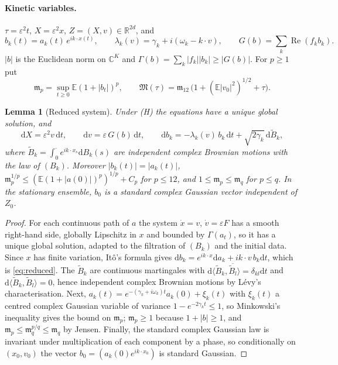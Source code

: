 \documentclass[11pt]{article}
\newcommand{\dd}{\mathrm{d}}
\newcommand{\E}{\mathbb{E}}
\newcommand{\eps}{\varepsilon}
\newcommand{\fm}{\mathfrak{m}}
\newcommand{\fM}{\mathfrak{M}}
\newcommand{\R}{\mathbb{R}}
\newcommand{\C}{\mathbb{C}}
\renewcommand{\Re}{\operatorname{Re}}
\newtheorem{lemma}[theorem]{Lemma}
\theoremstyle{remark}
\begin{document}
\paragraph{Kinetic variables.} $\tau=\eps^2t$, $X=\eps^2x$, $Z=(X,v)\in
\R^{2d}$, and
\[
  b_k(t)=a_k(t)\,e^{ik\cdot x(t)},\qquad
  \lambda_k(v)=\gamma_k+i(\omega_k-k\cdot v),\qquad
  G(b)=\sum_k\Re(f_kb_k).
\]
$|b|$ is the Euclidean norm on $\C^K$ and $\Gamma(b)=\sum_k|f_k||b_k|\ge
|G(b)|$. For $p\ge1$ put
\[
  \fm_p=\sup_{t\ge0}\E(1+|b_t|)^p ,\qquad
  \fM(\tau)=\fm_{12}\,\bigl(1+(\E|v_0|^2)^{1/2}+\tau\bigr).
\]

\begin{lemma}[Reduced system]\label{lem:reduced}
Under (H) the equations have a unique global solution, and
\begin{equation}
  \dd X=\eps^2v\,\dd t,\qquad \dd v=\eps\,G(b)\,\dd t,\qquad
  \dd b_k=-\lambda_k(v)\,b_k\,\dd t+\sqrt{2\gamma_k}\,\dd\tilde B_k ,
  \label{eq:reduced}
\end{equation}
where $\tilde B_k=\int_0^\cdot e^{ik\cdot x_s}\dd B_k(s)$ are independent
complex Brownian motions with the law of $(B_k)$. Moreover $|b_k(t)|=
|a_k(t)|$, $\fm_p^{1/p}\le(\E(1+|a(0)|)^p)^{1/p}+C_p$ for $p\le12$, and
$1\le\fm_p\le\fm_q$ for $p\le q$. In the stationary ensemble, $b_0$ is a
standard complex Gaussian vector independent of $Z_0$.
\end{lemma}

\begin{proof}
For each continuous path of $a$ the system $\dot x=v$, $\dot v=\eps F$ has
a smooth right-hand side, globally Lipschitz in $x$ and bounded by
$\Gamma(a_t)$, so it has a unique global solution, adapted to the filtration
of $(B_k)$ and the initial data. Since $x$ has finite variation, It\^o's
formula gives $\dd b_k=e^{ik\cdot x}\dd a_k+ik\cdot v\,b_k\dd t$, which is
\eqref{eq:reduced}. The $\tilde B_k$ are continuous martingales with
$\dd\langle\tilde B_k,\overline{\tilde B_l}\rangle=\delta_{kl}\dd t$ and
$\dd\langle\tilde B_k,\tilde B_l\rangle=0$, hence independent complex
Brownian motions by L\'evy's characterisation. Next,
$a_k(t)=e^{-(\gamma_k+i\omega_k)t}a_k(0)+\xi_k(t)$ with $\xi_k(t)$ a centred
complex Gaussian variable of variance $1-e^{-2\gamma_kt}\le1$, so
Minkowski's inequality gives the bound on $\fm_p$; $\fm_p\ge1$ because
$1+|b|\ge1$, and $\fm_p\le\fm_q^{p/q}\le\fm_q$ by Jensen. Finally, the
standard complex Gaussian law is invariant under multiplication of each
component by a phase, so conditionally on $(x_0,v_0)$ the vector
$b_0=(a_k(0)e^{ik\cdot x_0})$ is standard Gaussian.
\end{proof}
\end{document}
